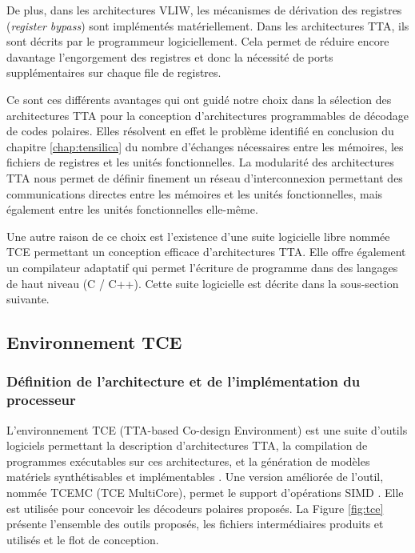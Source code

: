 De plus, dans les architectures VLIW, les mécanismes de dérivation des registres (\textit{register bypass}) sont implémentés matériellement. Dans les architectures TTA, ils sont décrits par le programmeur logiciellement. Cela permet de réduire encore davantage l'engorgement des registres et donc la nécessité de ports supplémentaires sur chaque file de registres.

Ce sont ces différents avantages qui ont guidé notre choix dans la sélection des architectures TTA pour la conception d'architectures programmables de décodage de codes polaires. Elles résolvent en effet le problème identifié en conclusion du chapitre \ref{chap:tensilica} du nombre d'échanges nécessaires entre les mémoires, les fichiers de registres et les unités fonctionnelles. La modularité des architectures TTA nous permet de définir finement un réseau d'interconnexion permettant des communications directes entre les mémoires et les unités fonctionnelles, mais également entre les unités fonctionnelles elle-même.

Une autre raison de ce choix est l'existence d'une suite logicielle libre nommée TCE permettant un conception efficace d'architectures TTA. Elle offre également un compilateur adaptatif qui permet l'écriture de programme dans des langages de haut niveau (C / C++). Cette suite logicielle est décrite dans la sous-section suivante.


\subsection{Environnement TCE}

\subsubsection{Définition de l'architecture et de l'implémentation du processeur}

L'environnement TCE (TTA-based Co-design Environment) est une suite d'outils logiciels permettant la description d'architectures TTA, la compilation de programmes exécutables sur ces architectures, et la génération de modèles matériels synthétisables et implémentables \cite{jaaskelainen_hw/sw_2017}. Une version améliorée de l'outil, nommée TCEMC (TCE MultiCore), permet le support d'opérations SIMD \cite{tcemc_2011}. Elle est utilisée pour concevoir les décodeurs polaires proposés. La Figure \ref{fig:tce} présente l'ensemble des outils proposés, les fichiers intermédiaires produits et utilisés et le flot de conception.

